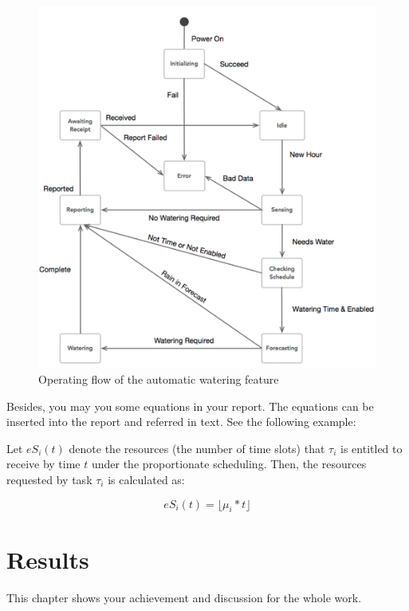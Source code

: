\documentclass[12pt]{report}
\begin{document}
\begin{figure}[ht]
	\begin{center}
		\includegraphics[width=\textwidth]{OperatingFlow.png}
		\caption{Operating flow of the automatic watering feature}\label{fig:operatingflow}
	\end{center}
\end{figure}

Besides,
you may you some equations in your report.
The equations can be inserted into the report and referred in text.
See the following example:

Let $eS_i(t)$ denote the resources (the number of time slots)
that $\tau_i$ is entitled to receive by time $t$ under the proportionate scheduling.
Then, the resources requested by task $\tau_i$ is calculated as:

\begin{equation} \label{eS}
	eS_i(t) = \lfloor \mu_i*t \rfloor
\end{equation}

\chapter{Results}
This chapter shows your achievement and discussion for the whole work.
\end{document}
